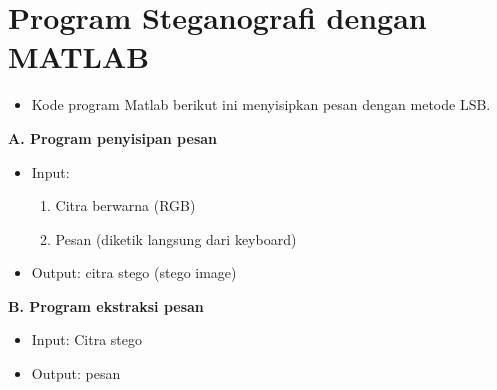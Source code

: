 \documentclass{article}
\begin{document}

\section*{Program Steganografi dengan MATLAB}

\begin{itemize}
    \item Kode program Matlab berikut ini menyisipkan pesan dengan metode LSB.
\end{itemize}

\textbf{A. Program penyisipan pesan}
\begin{itemize}
    \item Input:
    \begin{enumerate}
        \item Citra berwarna (RGB)
        \item Pesan (diketik langsung dari keyboard)
    \end{enumerate}
    \item Output: citra stego (stego image)
\end{itemize}

\textbf{B. Program ekstraksi pesan}
\begin{itemize}
    \item Input: Citra stego
    \item Output: pesan
\end{itemize}
\end{document}
